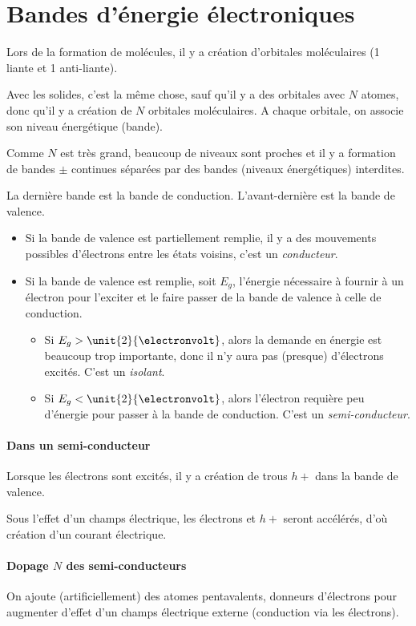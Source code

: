 \documentclass[11pt,a4paper,french]{article}
\begin{document}
\section{Bandes d'énergie électroniques}

Lors de la formation de molécules, il y a création d'orbitales moléculaires (1 liante et 1 anti-liante).

Avec les solides, c'est la même chose, sauf qu'il y a des orbitales avec $N$ atomes, donc qu'il y a création de $N$ orbitales moléculaires.
A chaque orbitale, on associe son niveau énergétique (bande).

Comme $N$ est très grand, beaucoup de niveaux sont proches et il y a formation de bandes $\pm$ continues séparées par des bandes (niveaux énergétiques) interdites.

La dernière bande est la bande de conduction.
L'avant-dernière est la bande de valence.

\begin{itemize}
	\item Si la bande de valence est partiellement remplie, il y a des mouvements possibles d'électrons entre les états voisins, c'est un {\em conducteur}.
	\item Si la bande de valence est remplie, soit $E_g$, l'énergie nécessaire à fournir à un électron pour l'exciter et le faire passer de la bande de valence à celle de conduction.
		\begin{itemize}
			\item Si $E_g > \unit{2}{\electronvolt}$, alors la demande en énergie est beaucoup trop importante, donc il n'y aura pas (presque) d'électrons excités.
				C'est un {\em isolant}.
			\item Si $E_g < \unit{2}{\electronvolt}$, alors l'électron requière peu d'énergie pour passer à la bande de conduction.
				C'est un {\em semi-conducteur}.
		\end{itemize}
\end{itemize}

\paragraph{Dans un semi-conducteur}
Lorsque les électrons sont excités, il y a création de trous $h+$ dans la bande de valence. %

Sous l'effet d'un champs électrique, les électrons et $h+$ seront accélérés, d'où création d'un courant électrique.

\paragraph{Dopage $N$ des semi-conducteurs}
On ajoute (artificiellement) des atomes pentavalents, donneurs d'électrons pour augmenter d'effet d'un champs électrique externe (conduction via les électrons).
\end{document}

